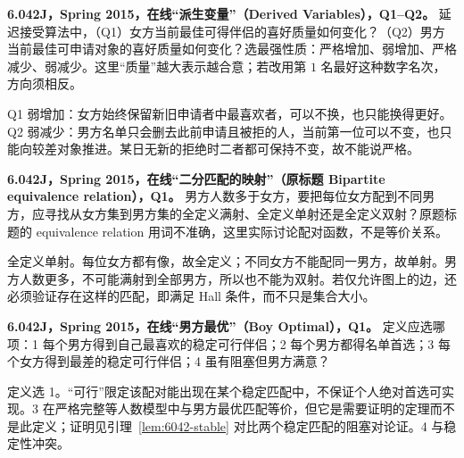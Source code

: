 \begin{exercise}
\textbf{6.042J，Spring 2015，在线“派生变量”（Derived Variables），Q1--Q2。}
延迟接受算法中，（Q1）女方当前最佳可得伴侣的喜好质量如何变化？（Q2）男方当前最佳可申请对象的喜好质量如何变化？选最强性质：严格增加、弱增加、严格减少、弱减少。这里“质量”越大表示越合意；若改用第 $1$ 名最好这种数字名次，方向须相反。
\label{mit:6042-online-derived-variables-q1}\label{mit:6042-online-derived-variables-q2}
\end{exercise}
\begin{solution}
Q1 弱增加：女方始终保留新旧申请者中最喜欢者，可以不换，也只能换得更好。Q2 弱减少：男方名单只会删去此前申请且被拒的人，当前第一位可以不变，也只能向较差对象推进。某日无新的拒绝时二者都可保持不变，故不能说严格。
\end{solution}

\begin{exercise}\label{mit:6042-online-bipartite-equivalence-relation-q1}
\textbf{6.042J，Spring 2015，在线“二分匹配的映射”（原标题 Bipartite equivalence relation），Q1。}
男方人数多于女方，要把每位女方配到不同男方，应寻找从女方集到男方集的全定义满射、全定义单射还是全定义双射？原题标题的 equivalence relation 用词不准确，这里实际讨论配对函数，不是等价关系。
\end{exercise}
\begin{solution}
全定义单射。每位女方都有像，故全定义；不同女方不能配同一男方，故单射。男方人数更多，不可能满射到全部男方，所以也不能为双射。若仅允许图上的边，还必须验证存在这样的匹配，即满足 Hall 条件，而不只是集合大小。
\end{solution}

\begin{exercise}\label{mit:6042-online-boy-optimal-q1}
\textbf{6.042J，Spring 2015，在线“男方最优”（Boy Optimal），Q1。}
定义应选哪项：1 每个男方得到自己最喜欢的稳定可行伴侣；2 每个男方都得名单首选；3 每个女方得到最差的稳定可行伴侣；4 虽有阻塞但男方满意？
\end{exercise}
\begin{solution}
定义选 1。“可行”限定该配对能出现在某个稳定匹配中，不保证个人绝对首选可实现。3 在严格完整等人数模型中与男方最优匹配等价，但它是需要证明的定理而不是此定义；证明见引理~\ref{lem:6042-stable} 对比两个稳定匹配的阻塞对论证。4 与稳定性冲突。
\end{solution}

